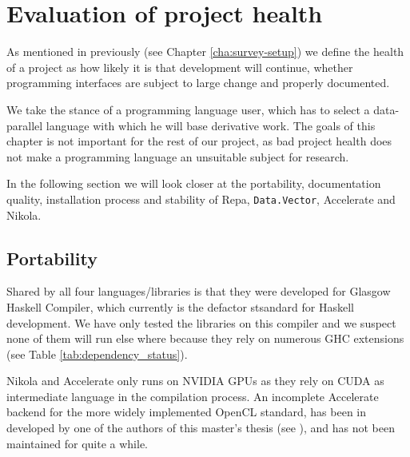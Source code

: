 \chapter{Evaluation of project health}
\label{chap:project-health}


As mentioned in previously (see Chapter
\ref{cha:survey-setup}) we define the health of a project as
how likely it is that development will continue, whether programming
interfaces are subject to large change and properly documented.


We take the stance of a programming language user, which has to select
a data-parallel language with which he will base derivative work. The
goals of this chapter is not important for the rest of our project, as
bad project health does not make a programming language an unsuitable
subject for research.

In the following section we will look closer at the portability,
documentation quality, installation process and stability of Repa,
\texttt{Data.Vector}, Accelerate and Nikola.

\section{Portability}
  


Shared by all four languages/libraries is that they were developed for
Glasgow Haskell Compiler, which currently is the defactor stsandard
for Haskell development. We have only tested the libraries on this
compiler and we suspect none of them will run else where because they
rely on numerous GHC extensions (see Table
\ref{tab:dependency_status}).

Nikola and Accelerate only runs on NVIDIA GPUs as they rely on CUDA as
intermediate language in the compilation process. An incomplete
Accelerate backend for the more widely implemented OpenCL standard,
has been in developed by one of the authors of this master's thesis
(see \cite{dybdal2011opencl}), and has not been maintained for quite
a while.

